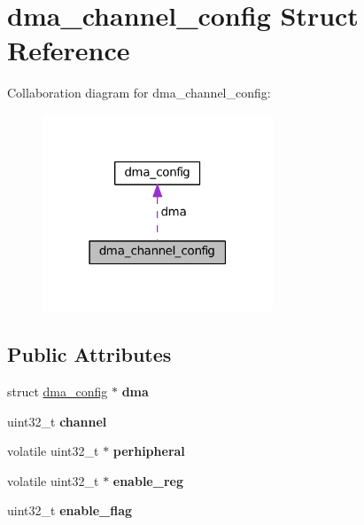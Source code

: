 \hypertarget{structdma__channel__config}{}\section{dma\+\_\+channel\+\_\+config Struct Reference}
\label{structdma__channel__config}


Collaboration diagram for dma\+\_\+channel\+\_\+config\+:
\nopagebreak
\begin{figure}[H]
\begin{center}
\leavevmode
\includegraphics[width=195pt]{structdma__channel__config__coll__graph}
\end{center}
\end{figure}
\subsection*{Public Attributes}
\begin{DoxyCompactItemize}
\item 
\hypertarget{structdma__channel__config_a0352048b957404e734bae6df7678ad38}{}struct \hyperlink{structdma__config}{dma\+\_\+config} $\ast$ {\bfseries dma}\label{structdma__channel__config_a0352048b957404e734bae6df7678ad38}

\item 
\hypertarget{structdma__channel__config_a924e6ca6c88d830241be32248294b63e}{}uint32\+\_\+t {\bfseries channel}\label{structdma__channel__config_a924e6ca6c88d830241be32248294b63e}

\item 
\hypertarget{structdma__channel__config_a1502b9f3fb49ee8e7a04ff49ff07e7c1}{}volatile uint32\+\_\+t $\ast$ {\bfseries perhipheral}\label{structdma__channel__config_a1502b9f3fb49ee8e7a04ff49ff07e7c1}

\item 
\hypertarget{structdma__channel__config_ae5a311bdf13af6200280be76472b60a0}{}volatile uint32\+\_\+t $\ast$ {\bfseries enable\+\_\+reg}\label{structdma__channel__config_ae5a311bdf13af6200280be76472b60a0}

\item 
\hypertarget{structdma__channel__config_ab58f12489030ee869dcf457eabf80cd6}{}uint32\+\_\+t {\bfseries enable\+\_\+flag}\label{structdma__channel__config_ab58f12489030ee869dcf457eabf80cd6}

\end{DoxyCompactItemize}


